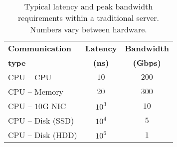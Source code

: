 %
\begin{table}
	\centering
	\caption{\small{Typical latency and peak bandwidth requirements within a traditional server. Numbers vary between hardware.}}
	\label{tab:tech}
	\vspace{0.1in}
  \begin{tabular}{l|c|c}
	  \hline
		\textbf{Communication} & \textbf{Latency} & \textbf{Bandwidth}\\
		\textbf{type} & \textbf{(ns)} & \textbf{(Gbps)}\\\hline \hline
    CPU -- CPU & $10$ & $200$\\\hline
    CPU -- Memory & $20$ & $300$\\\hline
    CPU -- $10$G NIC & $10^3$ & $10$\\\hline
    CPU -- Disk (SSD) & $10^4$ & $5$\\\hline
    CPU -- Disk (HDD) & $10^6$ & $1$\\\hline
    \hline
\end{tabular}
\end{table}
%
%
